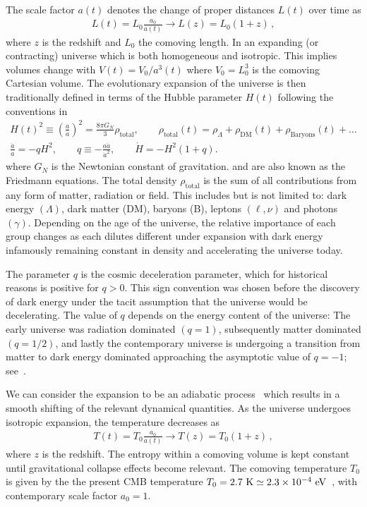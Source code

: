 The scale factor $a(t)$ denotes the change of proper distances $L(t)$ over time as
\begin{gather}
    L(t)=L_{0}\frac{a_{0}}{a(t)}\rightarrow L(z)=L_{0}(1+z)\,,
\end{gather}
where $z$ is the redshift and $L_{0}$ the comoving length. In an expanding (or contracting) universe which is both homogeneous and isotropic. This implies volumes change with $V(t)=V_{0}/a^{3}(t)$ where $V_{0}=L_{0}^{3}$ is the comoving Cartesian volume. The evolutionary expansion of the universe is then traditionally defined in terms of the Hubble parameter $H(t)$ following the conventions in~\cite{weinberg1972gravitation}
\begin{gather}
  \label{Friedmann:1} H(t)^{2}\equiv\left(\frac{\dot a}{a}\right)^2=\frac{8\pi G_{N}}{3}\rho_\mathrm{total},\qquad \rho_\mathrm{total}(t)=\rho_{\Lambda}+\rho_\mathrm{DM}(t)+\rho_\mathrm{Baryons}(t)+\ldots\\
  \label{Friedmann:2}
  \frac{\ddot a}{a}=-qH^2,\qquad 
q\equiv -\frac{a\ddot a}{\dot a^2},\qquad \dot H=-H^2(1+q).
\end{gather}
where $G_N$ is the Newtonian constant of gravitation.  and  are also known as the Friedmann equations. The total density $\rho_\mathrm{total}$ is the sum of all contributions from any form of matter, radiation or field. This includes but is not limited to: dark energy $(\Lambda)$, dark matter (DM), baryons (B), leptons $(\ell,\nu)$ and photons $(\gamma)$. Depending on the age of the universe, the relative importance of each group changes as each dilutes different under expansion with dark energy infamously remaining constant in density and accelerating the universe today.

The parameter $q$ is the cosmic deceleration parameter, which for historical reasons is positive for $q>0$. This sign convention was chosen before the discovery of dark energy under the tacit assumption that the universe would be decelerating. The value of $q$ depends on the energy content of the universe: The early universe was radiation dominated $(q = 1)$, subsequently matter dominated $(q = 1/2)$, and lastly the contemporary universe is undergoing a transition from matter to dark energy dominated approaching the asymptotic value of $q = -1$; see~\cite{Rafelski:2013yka}.

We can consider the expansion to be an adiabatic process~\citep{Abdalla:2022yfr} which results in a smooth shifting of the relevant dynamical quantities. As the universe undergoes isotropic expansion, the temperature decreases as 
\begin{gather}
 \label{tscale}
 T(t)=T_{0}\frac{a_{0}}{a(t)}\rightarrow T(z)=T_{0}(1+z)\,,
\end{gather}
where $z$ is the redshift. The entropy within a comoving volume is kept constant until gravitational collapse effects become relevant. The comoving temperature $T_{0}$ is given by the the present CMB temperature $T_{0}=2.7{\rm\ K}\simeq2.3\times10^{-4}\eV$~\citep{Planck:2018vyg}, with contemporary scale factor $a_{0}=1$.

